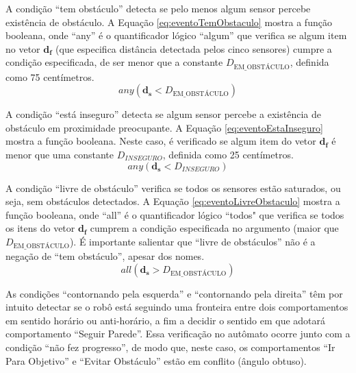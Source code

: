 		A condição ``tem obstáculo'' detecta se pelo menos algum sensor percebe existência de 
		obstáculo. A Equação \ref{eq:eventoTemObstaculo} mostra a função booleana, onde ``any''
		é o quantificador lógico ``algum'' que verifica se algum item no vetor $\mathbf{d_f}$ 
		(que especifica distância detectada pelos cinco sensores) cumpre a condição especificada, 
		de ser menor que a constante $D_{\text{EM\_OBSTÁCULO}}$, definida como 75 centímetros.
		\begin{equation}
			\label{eq:eventoTemObstaculo}
			any(\mathbf{d_s} < D_{\text{EM\_OBSTÁCULO}})
		\end{equation}
		
		A condição ``está inseguro'' detecta se algum sensor percebe a existência de obstáculo 
		em proximidade preocupante. A Equação \ref{eq:eventoEstaInseguro} mostra a função booleana.
		Neste caso, é verificado se algum item do vetor $\mathbf{d_f}$ é menor que uma constante 
		$D_{INSEGURO}$, definida como 25 centímetros.
		\begin{equation}
			\label{eq:eventoEstaInseguro}
			any(\mathbf{d_s} < D_{INSEGURO})
		\end{equation}
		
		A condição ``livre de obstáculo'' verifica se todos os sensores estão saturados, ou seja,
		sem obstáculos detectados. A Equação \ref{eq:eventoLivreObstaculo} mostra a função booleana,
		onde ``all'' é o quantificador lógico ``todos" que verifica se todos os itens do vetor 
		$\mathbf{d_f}$ cumprem a condição especificada no argumento (maior que 
		$D_{\text{EM\_OBSTÁCULO}}$). É importante salientar que ``livre de obstáculos'' não é 
		a negação de ``tem obstáculo'', apesar dos nomes. 
		\begin{equation}
			\label{eq:eventoLivreObstaculo}
			all(\mathbf{d_s} > D_{\text{EM\_OBSTÁCULO}})
		\end{equation}
				
		As condições ``contornando pela esquerda'' e ``contornando pela direita'' têm por intuito
		detectar se o robô está seguindo uma fronteira entre dois comportamentos em sentido 
		horário ou anti-horário, a fim a decidir o sentido em que adotará comportamento 
		``Seguir Parede''. Essa verificação no autômato ocorre junto com a condição ``não fez
		progresso'', de modo que, neste caso, os comportamentos ``Ir Para Objetivo'' e ``Evitar 
		Obstáculo'' estão em conflito (ângulo obtuso). 
		
